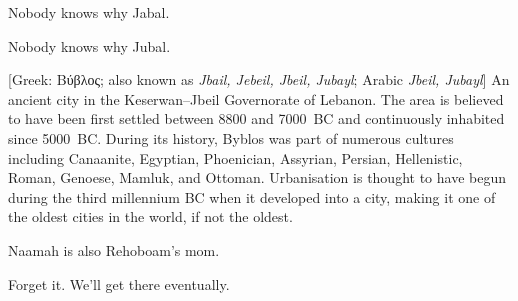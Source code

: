 {
}
{
}
{
	Nobody knows why Jabal.
}

{
}
{
}
{
	Nobody knows why Jubal.

	[Greek: Βύβλος; also known as \textit{Jbail, Jebeil, Jbeil, Jubayl}; Arabic  \textit{Jbeil, Jubayl}]{
		An ancient city in the Keserwan--Jbeil Governorate of Lebanon.
		The area is believed to have been first settled between 8800 and
		7000~BC and continuously inhabited since 5000~BC. During its
		history, Byblos was part of numerous cultures including Canaanite,
		Egyptian, Phoenician, Assyrian, Persian, Hellenistic, Roman,
		Genoese, Mamluk, and Ottoman. Urbanisation is thought to have
		begun during the third millennium BC when it developed into a city,
		making it one of the oldest cities in the world, if not the oldest.
	}
}

{
}
{
}
{
	Naamah is also Rehoboam's mom.
	
	
	Forget it. We'll get there eventually.
}

